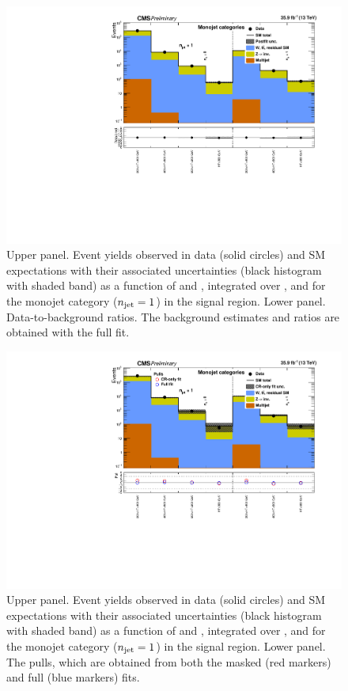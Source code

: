 \clearpage
\begin{figure}[h!]
  \centering
  \caption{Upper panel. Event yields observed in data (solid circles)
    and SM expectations with their associated uncertainties (black
    histogram with shaded band) as a function of \nb and \scalht,
    integrated over \mht, and for the monojet category ($n_{\text{jet}} = 1$)
    in the signal region. Lower panel. Data-to-background ratios. The
    background estimates and ratios are obtained with the full fit. }
  \label{fig:mr_mono_post}
  \includegraphics[width=1.\linewidth]{figures/results/36invfb_preapproval/mono/summaryPlot_Monojet_fit_b}
\end{figure}

\clearpage
\begin{figure}[h!]
  \centering
  \caption{Upper panel. Event yields observed in data (solid circles)
    and SM expectations with their associated uncertainties (black
    histogram with shaded band) as a function of \nb and \scalht,
    integrated over \mht, and for the monojet category ($n_{\text{jet}} = 1$)
    in the signal region. Lower panel. The pulls, which are obtained
    from both the masked (red markers) and full (blue markers) fits. }
  \label{fig:mr_mono_pulls}
  \includegraphics[width=1.\linewidth]{figures/results/36invfb_preapproval/mono/summaryPlot_Monojet_prefit_overlay_fit_b}
\end{figure}

